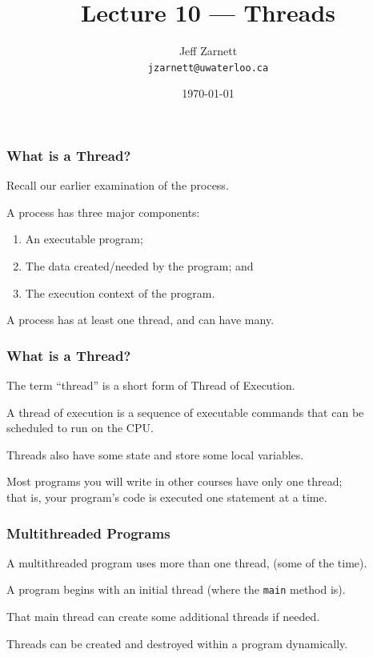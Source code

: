 

\title{Lecture 10 --- Threads}

\author{Jeff Zarnett \\ \small \texttt{jzarnett@uwaterloo.ca}}
\date{\today}




\begin{frame}
	\titlepage

\end{frame}

\begin{frame}
	\frametitle{What is a Thread?}


	Recall our earlier examination of the process.

	A process has three major components:
	\begin{enumerate}
		\item An executable program;
		\item The data created/needed by the program; and
		\item The execution context of the program.
	\end{enumerate}

	A process has at least one \alert{thread}, and can have many.

\end{frame}

\begin{frame}
	\frametitle{What is a Thread?}

	The term ``thread'' is a short form of \alert{Thread of Execution}.

	A thread of execution is a sequence of executable commands that can be scheduled to run on the CPU.

	Threads also have some state and store some local variables.

	Most programs you will write in other courses have only one thread;\\
	\quad that is, your program's code is executed one statement at a time.

\end{frame}

\begin{frame}
	\frametitle{Multithreaded Programs}

	A multithreaded program uses more than one thread, (some of the time).

	A program begins with an initial thread (where the \texttt{main} method is).

	That main thread can create some additional threads if needed.

	Threads can be created and destroyed within a program dynamically.

\end{frame}

